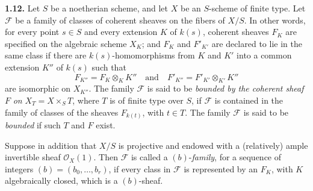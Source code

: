 \textbf{1.12.} Let \(S\) be a noetherian scheme, and let \(X\) be an
\(S\)-scheme of finite type. Let \(\mathcal F\) be a family of classes of
coherent sheaves on the fibers of \(X/S\). In other words, for every point
\(s\in S\) and every extension \(K\) of \(k(s)\), coherent sheaves \(F_K\)
are specified on the algebraic scheme \(X_K\); and \(F_K\) and
\(F'_{K'}\) are declared to lie in the same class if there are
\(k(s)\)-homomorphisms from \(K\) and \(K'\) into a common extension
\(K''\) of \(k(s)\) such that
\[
  F_{K''}=F_K\otimes_KK''
  \quad\text{and}\quad
  F'_{K''}=F'_{K'}\otimes_{K'}K''
\]
are isomorphic on \(X_{K''}\). The family \(\mathcal F\) is said to be
\emph{bounded by the coherent sheaf} \(F\) \emph{on}
\(X_T=X\times_ST\), where \(T\) is of finite type over \(S\), if
\(\mathcal F\) is contained in the family of classes of the sheaves
\(F_{k(t)}\), with \(t\in T\). The family \(\mathcal F\) is said to be
\emph{bounded} if such \(T\) and \(F\) exist.

Suppose in addition that \(X/S\) is projective and endowed with a
(relatively) ample invertible sheaf \(\mathcal O_X(1)\). Then
\(\mathcal F\) is called a \((b)\)-\emph{family}, for a sequence of integers
\((b)=(b_0,\ldots,b_r)\), if every class in \(\mathcal F\) is represented
by an \(F_K\), with \(K\) algebraically closed, which is a
\((b)\)-sheaf.
